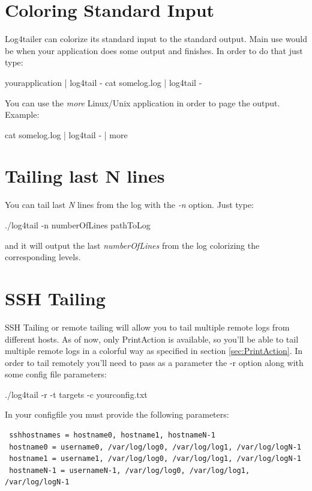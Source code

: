 \section{Coloring Standard Input}
Log4tailer can colorize its standard input to the standard output. Main use would be when your application 
does some output and finishes. In order to do that just type:
\begin{cmd}
 yourapplication | log4tail -
 cat somelog.log | log4tail -
\end{cmd}
You can use the \emph{more} Linux/Unix application in order to page the output. Example:
\begin{cmd}
 cat somelog.log | log4tail - | more
\end{cmd}

\section{Tailing last N lines}
You can tail last \emph{N} lines from the log with the \emph{-n} option. Just type:
\begin{cmd}
 ./log4tail -n numberOfLines pathToLog
\end{cmd}
and it will output the last \emph{numberOfLines} from the log colorizing the corresponding levels.

\section{SSH Tailing}
SSH Tailing or remote tailing will allow you to tail multiple remote logs from different hosts. As of now, only 
PrintAction is available, so you'll be able to tail multiple remote logs in a colorful way as specified in 
section \ref{sec:PrintAction}. In order to tail remotely you'll need to pass as a parameter the -r option 
along with some config file parameters:
\begin{cmd}
 ./log4tail -r -t targets -c yourconfig.txt
\end{cmd}
In your configfile you must provide the following parameters:

\begin{config}
\begin{verbatim}
 sshhostnames = hostname0, hostname1, hostnameN-1
 hostname0 = username0, /var/log/log0, /var/log/log1, /var/log/logN-1
 hostname1 = username1, /var/log/log0, /var/log/log1, /var/log/logN-1
 hostnameN-1 = usernameN-1, /var/log/log0, /var/log/log1, /var/log/logN-1
\end{verbatim}
\end{config}

